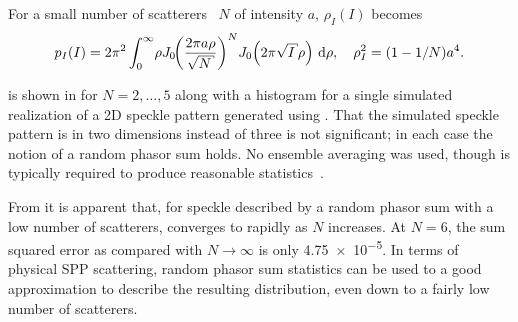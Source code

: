 For a small number of scatterers~\cite{jakeman1984speckle} $N$ of intensity
$a$, $\rho_I(I)$ becomes~\cite{goodman2007speckle}
\begin{equation}
				p_I(I) = 2\pi^2 \int_0^\infty\! \rho J_0\!{\left(\frac{2\pi a
				\rho}{\sqrt{N}}\right)}^N J_0\!\left(2\pi\sqrt{I}\rho\right)\md\rho,\quad \rho_I^2=(1-1/N)a^4.
\label{eqn:smallscatteqn}
\end{equation}

 is shown in  for
$N=2,\ldots,5$ along with a histogram for a single simulated realization of a
2D speckle pattern generated using .  That the
simulated speckle pattern is in two dimensions instead of three is not
significant; in each case the notion of a random phasor sum holds.  No ensemble
averaging was used, though is typically required to produce reasonable
statistics~\cite{goodman2007speckle}.

From  it is apparent that, for speckle described by a
random phasor sum with a low number of scatterers,
 converges to  rapidly as $N$
increases.  At $N=6$, the sum squared error as compared with $N\to\infty$ is
only \num{4.75e-5}.  In terms of physical SPP scattering, random phasor sum
statistics can be used to a good approximation to describe the resulting
distribution, even down to a fairly low number of scatterers.
